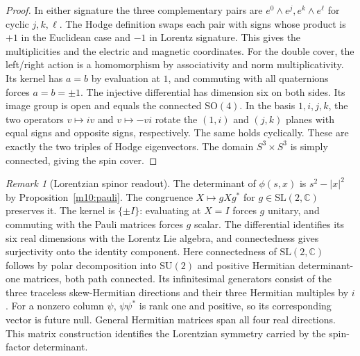 \documentclass[11pt,reqno]{amsart}
\theoremstyle{definition}
\theoremstyle{remark}
\newtheorem{remark}[theorem]{Remark}
\numberwithin{equation}{section}
\newcommand{\C}{\mathbb{C}}
\newcommand{\SU}{\mathrm{SU}}
\newcommand{\SO}{\mathrm{SO}}
\begin{document}
\begin{proof}
In either signature the three complementary pairs are
\(e^0\wedge e^j,e^k\wedge e^\ell\) for cyclic \(j,k,\ell\).
The Hodge definition swaps each pair with signs whose product
is \(+1\) in the Euclidean case and \(-1\) in Lorentz signature.
This gives the multiplicities and the electric and magnetic
coordinates. For the double cover, the left/right action is a
homomorphism by associativity and norm multiplicativity. Its
kernel has \(a=b\) by evaluation at \(1\), and commuting with all
quaternions forces \(a=b=\pm1\). The injective differential has
dimension six on both sides. Its image group is open and equals
the connected \(\SO(4)\). In the basis \(1,i,j,k\), the two
operators \(v\mapsto iv\) and \(v\mapsto -vi\) rotate the
\((1,i)\) and \((j,k)\) planes with equal signs and opposite signs,
respectively. The same holds cyclically. These are exactly the
two triples of Hodge eigenvectors. The domain \(S^3\times S^3\)
is simply connected, giving the spin cover.
\end{proof}

\begin{remark}[Lorentzian spinor readout]\label{m10:lorentz}
The determinant of \(\phi(s,x)\) is \(s^2-|x|^2\) by
Proposition~\ref{m10:pauli}. The congruence
\(X\mapsto gXg^*\) for \(g\in\mathrm{SL}(2,\C)\) preserves it.
The kernel is \(\{\pm I\}\): evaluating at \(X=I\) forces \(g\)
unitary, and commuting with the Pauli matrices forces \(g\)
scalar. The differential identifies its six real dimensions with
the Lorentz Lie algebra, and connectedness gives surjectivity
onto the identity component. Here connectedness of
\(\mathrm{SL}(2,\C)\) follows by polar decomposition into
\(\SU(2)\) and positive Hermitian determinant-one matrices,
both path connected. Its infinitesimal generators consist of the
three traceless skew-Hermitian directions and their three
Hermitian multiples by \(i\). For a nonzero column \(\psi\),
\(\psi\psi^*\) is rank one and positive, so its corresponding
vector is future null. General Hermitian matrices span all
four real directions. This matrix construction identifies
the Lorentzian symmetry carried by the spin-factor determinant.
\end{remark}
\end{document}
